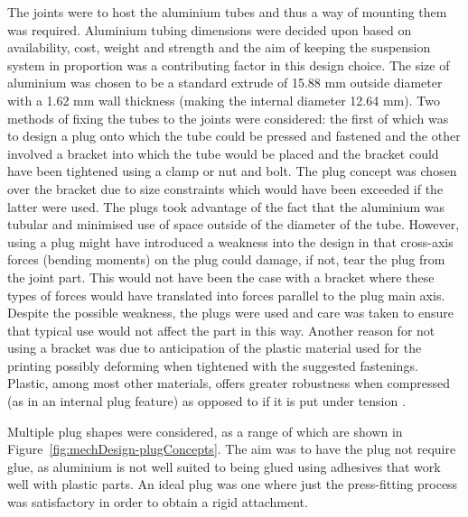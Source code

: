         The joints were to host the aluminium tubes and thus a way of mounting them was required. Aluminium tubing dimensions were decided upon based on availability, cost, weight and strength and the aim of keeping the suspension system in proportion was a contributing factor in this design choice. The size of aluminium was chosen to be a standard extrude of 15.88 mm outside diameter with a 1.62 mm wall thickness (making the internal diameter 12.64 mm). Two methods of fixing the tubes to the joints were considered: the first of which was to design a plug onto which the tube could be pressed and fastened and the other involved a bracket into which the tube would be placed and the bracket could have been tightened using a clamp or nut and bolt. The plug concept was chosen over the bracket due to size constraints which would have been exceeded if the latter were used. The plugs took advantage of the fact that the aluminium was tubular and minimised use of space outside of the diameter of the tube. However, using a plug might have introduced a weakness into the design in that cross-axis forces (bending moments) on the plug could damage, if not, tear the plug from the joint part. This would not have been the case with a bracket where these types of forces would have translated into forces parallel to the plug main axis. Despite the possible weakness, the plugs were used and care was taken to ensure that typical use would not affect the part in this way. Another reason for not using a bracket was due to anticipation of the plastic material used for the printing possibly deforming when tightened with the suggested fastenings. Plastic, among most other materials, offers greater robustness when compressed (as in an internal plug feature) as opposed to if it is put under tension \cite{makerbotStrength}.
        
        Multiple plug shapes were considered, as a range of which are shown in Figure~\ref{fig:mechDesign-plugConcepts}. The aim was to have the plug not require glue, as aluminium is not well suited to being glued using adhesives that work well with plastic parts. An ideal plug was one where just the press-fitting process was satisfactory in order to obtain a rigid attachment.
        
